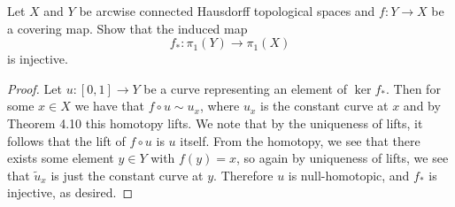 \documentclass[10pt]{amsart}
\begin{document}
\begin{thm}
  Let $X$ and $Y$ be arcwise connected Hausdorff topological spaces and $f \colon Y \rightarrow X$ be a covering map.
  Show that the induced map 
  $$f_* \colon \pi_1(Y) \rightarrow \pi_1(X)$$
  is injective.

  \begin{proof}
    Let $u \colon [0,1] \rightarrow Y$ be a curve representing an element of $\ker f_*$.
    Then for some $x \in X$ we have that $f \circ u \sim u_x$, where $u_x$ is the constant curve at $x$ and by Theorem 4.10 this homotopy lifts.
    We note that by the uniqueness of lifts, it follows that the lift of $f \circ u$ is $u$ itself.
    From the homotopy, we see that there exists some element $y \in Y$ with $f(y) = x$, so again by uniqueness of lifts, we see that $\tilde{u}_x$ is just the constant curve at $y$.
    Therefore $u$ is null-homotopic, and $f_*$ is injective, as desired.
  \end{proof}
\end{thm}
\end{document}
